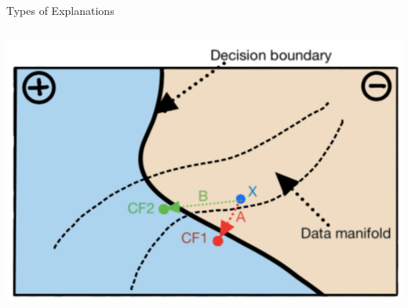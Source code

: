 \documentclass[10pt,compress,t,notes=noshow, xcolor=table]{beamer}
\begin{document}
\begin{frame}{Types of Explanations}
{\begin{columns}[c, totalwidth=\textwidth]
\begin{column}{0.38\linewidth}
        \centering \includegraphics[page=1, width=\textwidth]{figure/counterfactuals_obj}
    \end{column}
	\end{columns}}
	
\end{frame}





\end{document}
